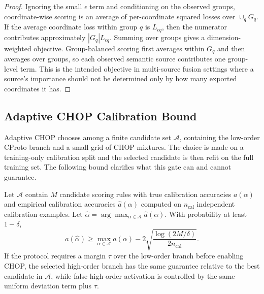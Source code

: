 \begin{proof}
Ignoring the small \(\epsilon\) term and conditioning on the observed groups, coordinate-wise scoring is an average of per-coordinate squared losses over \(\cup_qG_q\). If the average coordinate loss within group \(q\) is \(L_{cq}\), then the numerator contributes approximately \(|G_q|L_{cq}\). Summing over groups gives a dimension-weighted objective. Group-balanced scoring first averages within \(G_q\) and then averages over groups, so each observed semantic source contributes one group-level term. This is the intended objective in multi-source fusion settings where a source's importance should not be determined only by how many exported coordinates it has.
\end{proof}

\subsection{Adaptive CHOP Calibration Bound}

Adaptive CHOP chooses among a finite candidate set \(\mathcal A\), containing the low-order CProto branch and a small grid of CHOP mixtures. The choice is made on a training-only calibration split and the selected candidate is then refit on the full training set. The following bound clarifies what this gate can and cannot guarantee.

\begin{proposition}
Let \(\mathcal A\) contain \(M\) candidate scoring rules with true calibration accuracies \(a(\alpha)\) and empirical calibration accuracies \(\hat a(\alpha)\) computed on \(n_{\mathrm{cal}}\) independent calibration examples. Let \(\hat\alpha=\arg\max_{\alpha\in\mathcal A}\hat a(\alpha)\). With probability at least \(1-\delta\),
\begin{equation}
    a(\hat\alpha)
    \ge
    \max_{\alpha\in\mathcal A}a(\alpha)
    -2\sqrt{\frac{\log(2M/\delta)}{2n_{\mathrm{cal}}}} .
\end{equation}
If the protocol requires a margin \(\tau\) over the low-order branch before enabling CHOP, the selected high-order branch has the same guarantee relative to the best candidate in \(\mathcal A\), while false high-order activation is controlled by the same uniform deviation term plus \(\tau\).
\end{proposition}

